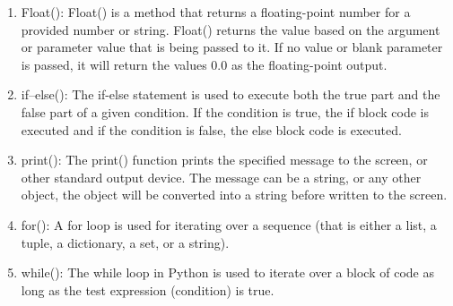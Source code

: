 \documentclass[a4paper]{article}
\begin{document}
\begin{enumerate}
    \item Float(): Float() is a method that returns a floating-point number for a provided number or string. Float() returns the value based on the argument or parameter value that is being passed to it. If no value or blank parameter is passed, it will return the values 0.0 as the floating-point output.
    \item if--else(): The if-else statement is used to execute both the true part and the false part of a given condition. If the condition is true, the if block code is executed and if the condition is false, the else block code is executed.
    \item print(): The print() function prints the specified message to the screen, or other standard output device. The message can be a string, or any other object, the object will be converted into a string before written to the screen.
    \item for(): A for loop is used for iterating over a sequence (that is either a list, a tuple, a dictionary, a set, or a string).
    \item while(): The while loop in Python is used to iterate over a block of code as long as the test expression (condition) is true. 
\end{enumerate}
\end{document}
